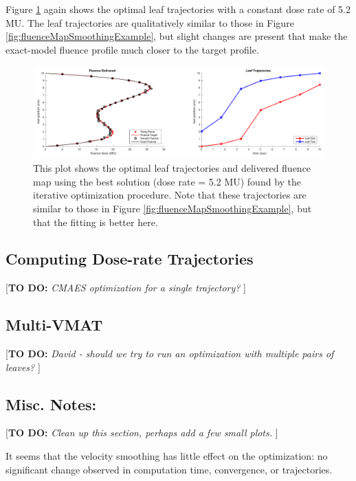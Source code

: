 \documentclass[12pt]{article}
\newcommand{\todo}[1]{{\color{lightblue}\par {[{\bf TO DO: } {\em #1}} ] \\    }}
\begin{document}
Figure \ref{fig:fluenceMapIterativeBest} again shows the optimal leaf trajectories with a
constant dose rate of 5.2 MU. The leaf trajectories are qualitatively similar to those in
Figure \ref{fig:fluenceMapSmoothingExample}, but slight changes are present that make the
exact-model fluence profile much closer to the target profile.

\begin{figure}
  \centering
  \includegraphics[width=\textwidth]{fig/fluenceMapIterativeBest.pdf}
  \caption{This plot shows the optimal leaf trajectories and delivered fluence map using the
           best solution (dose rate = 5.2 MU) found by the iterative optimization procedure.
           Note that these trajectories are similar to those in
           Figure \ref{fig:fluenceMapSmoothingExample}, but that the fitting is better here.}
  \label{fig:fluenceMapIterativeBest}
\end{figure}


\subsection{Computing Dose-rate Trajectories}

\todo{CMAES optimization for a single trajectory?}

\subsection{Multi-VMAT}

\todo{David - should we try to run an optimization with multiple pairs of leaves?}

\subsection{Misc. Notes:}

\todo{Clean up this section, perhaps add a few small plots.}

It seems that the velocity smoothing has little effect on the optimization: no significant
change observed in computation time, convergence, or trajectories.
\end{document}
